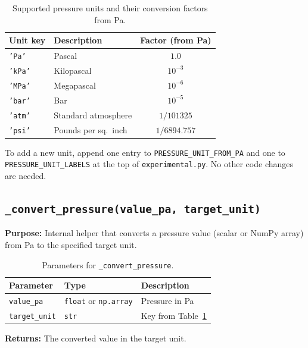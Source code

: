 \documentclass[11pt, letterpaper]{article}
\begin{document}
\begin{table}[h!]
\centering
\caption{Supported pressure units and their conversion factors from Pa.}
\label{tab:units}
\begin{tabular}{@{}llc@{}}
\toprule
\textbf{Unit key} & \textbf{Description} & \textbf{Factor (from Pa)} \\
\midrule
\texttt{'Pa'}  & Pascal              & $1.0$ \\
\texttt{'kPa'} & Kilopascal          & $10^{-3}$ \\
\texttt{'MPa'} & Megapascal          & $10^{-6}$ \\
\texttt{'bar'} & Bar                 & $10^{-5}$ \\
\texttt{'atm'} & Standard atmosphere & $1/101325$ \\
\texttt{'psi'} & Pounds per sq.\ inch & $1/6894.757$ \\
\bottomrule
\end{tabular}
\end{table}

To add a new unit, append one entry to \texttt{PRESSURE\_UNIT\_FROM\_PA}
and one to \texttt{PRESSURE\_UNIT\_LABELS} at the top of
\texttt{experimental.py}. No other code changes are needed.

\subsection{\texttt{\_convert\_pressure(value\_pa, target\_unit)}}
\label{subsec:convert_pressure}

\textbf{Purpose:} Internal helper that converts a pressure value (scalar
or NumPy array) from Pa to the specified target unit.

\begin{table}[h!]
\centering
\caption{Parameters for \texttt{\_convert\_pressure}.}
\begin{tabular}{@{}lll@{}}
\toprule
\textbf{Parameter} & \textbf{Type} & \textbf{Description} \\
\midrule
\texttt{value\_pa}   & \texttt{float} or \texttt{np.array} & Pressure in Pa \\
\texttt{target\_unit} & \texttt{str} & Key from Table~\ref{tab:units} \\
\bottomrule
\end{tabular}
\end{table}

\textbf{Returns:} The converted value in the target unit.
\end{document}
